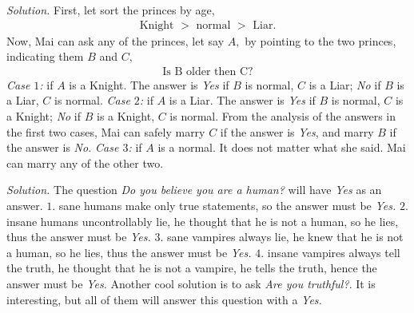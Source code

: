 \begin{multicols}{2}
	\vskip 0.2cm
	\textit{Solution.}
	First, let sort the princes by age, 
	\begin{align*}
		\text{Knight\ } > \text{\ normal\ } > \text{\ Liar}.
	\end{align*}
	Now, Mai can ask any of the princes, let say $A,$ by pointing to the two princes,
	indicating them $B$ and $C,$ 
	\begin{align*}
		\text{Is B older then C?}
	\end{align*}
	\textit{Case $1$:} if $A$ is a Knight.
	The answer is \textit{Yes} if $B$ is normal, $C$ is a Liar;
	\textit{No} if $B$ is a Liar, $C$ is normal.
	\vskip 0.1cm
	\textit{Case $2$:} if $A$ is a Liar.
	The answer is \textit{Yes} if $B$ is normal, $C$ is a Knight;
	\textit{No} if $B$ is a Knight, $C$ is normal.
	\vskip 0.1cm
	From the analysis of the answers in the first two cases,
	Mai can safely marry $C$ if the answer is \textit{Yes},
	and marry $B$ if the answer is \textit{No.} 
	\vskip 0.1cm
	\textit{Case $3$:} if $A$ is a normal. It does not matter what she said.
	Mai can marry any of the other two.
	\vskip 0.2cm
	
	\vskip 0.2cm
	\textit{Solution.}
	The question \textit{Do you believe you are a human?} will have \textit{Yes} as an answer.
	\vskip 0.1cm
	$1.$ sane humans make only true statements, so the answer must be \textit{Yes.}
	\vskip 0.1cm
	$2.$ insane humans uncontrollably lie, he thought that he is not a human, so he lies, thus the answer must be \textit{Yes.}
	\vskip 0.1cm
	$3.$ sane vampires always lie, he knew that he is not a human, so he lies, thus the answer must be \textit{Yes.}
	\vskip 0.1cm
	$4.$ insane vampires always tell the truth, he thought that he is not a vampire, he tells the truth, hence the answer must be \textit{Yes.}
	\vskip 0.1cm	
	Another cool solution is to ask \textit{Are you truthful?}.
	It is interesting, but all of them will answer this question with a \textit{Yes.}
\end{multicols}